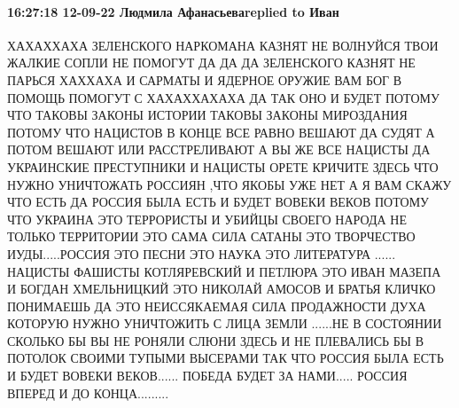  
 
 
 
 


\paragraph{16:27:18 12-09-22 Людмила Афанасьеваreplied to Иван}

ХАХАХХАХА ЗЕЛЕНСКОГО НАРКОМАНА КАЗНЯТ НЕ ВОЛНУЙСЯ ТВОИ ЖАЛКИЕ СОПЛИ НЕ
ПОМОГУТ ДА ДА ДА ЗЕЛЕНСКОГО КАЗНЯТ НЕ ПАРЬСЯ ХАХХАХА И САРМАТЫ И
ЯДЕРНОЕ ОРУЖИЕ ВАМ БОГ В ПОМОЩЬ ПОМОГУТ С
ХАХАХХАХАХА ДА ТАК
ОНО И БУДЕТ ПОТОМУ ЧТО ТАКОВЫ ЗАКОНЫ ИСТОРИИ ТАКОВЫ ЗАКОНЫ
МИРОЗДАНИЯ ПОТОМУ ЧТО НАЦИСТОВ В КОНЦЕ ВСЕ РАВНО ВЕШАЮТ ДА
СУДЯТ А ПОТОМ ВЕШАЮТ ИЛИ РАССТРЕЛИВАЮТ А ВЫ ЖЕ ВСЕ НАЦИСТЫ ДА
УКРАИНСКИЕ ПРЕСТУПНИКИ И НАЦИСТЫ ОРЕТЕ КРИЧИТЕ ЗДЕСЬ ЧТО
НУЖНО УНИЧТОЖАТЬ РОССИЯН ,ЧТО
ЯКОБЫ УЖЕ НЕТ А Я ВАМ СКАЖУ ЧТО ЕСТЬ ДА РОССИЯ БЫЛА ЕСТЬ
И БУДЕТ ВОВЕКИ ВЕКОВ ПОТОМУ ЧТО УКРАИНА ЭТО ТЕРРОРИСТЫ И УБИЙЦЫ СВОЕГО НАРОДА НЕ ТОЛЬКО
ТЕРРИТОРИИ ЭТО САМА СИЛА САТАНЫ ЭТО ТВОРЧЕСТВО ИУДЫ.....РОССИЯ
ЭТО ПЕСНИ ЭТО НАУКА ЭТО ЛИТЕРАТУРА ......
НАЦИСТЫ ФАШИСТЫ КОТЛЯРЕВСКИЙ И ПЕТЛЮРА ЭТО ИВАН МАЗЕПА И БОГДАН
ХМЕЛЬНИЦКИЙ ЭТО НИКОЛАЙ АМОСОВ И БРАТЬЯ КЛИЧКО ПОНИМАЕШЬ ДА
ЭТО НЕИССЯКАЕМАЯ СИЛА ПРОДАЖНОСТИ ДУХА КОТОРУЮ НУЖНО УНИЧТОЖИТЬ С ЛИЦА ЗЕМЛИ ......НЕ В
СОСТОЯНИИ СКОЛЬКО БЫ ВЫ НЕ РОНЯЛИ СЛЮНИ ЗДЕСЬ И НЕ ПЛЕВАЛИСЬ
БЫ В ПОТОЛОК СВОИМИ ТУПЫМИ ВЫСЕРАМИ ТАК ЧТО РОССИЯ БЫЛА ЕСТЬ
И БУДЕТ ВОВЕКИ ВЕКОВ......
ПОБЕДА БУДЕТ ЗА НАМИ.....
РОССИЯ ВПЕРЕД И ДО КОНЦА.........
